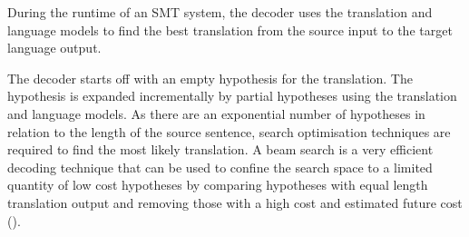 




During the runtime of an \acrshort{SMT} system, the decoder uses the translation and language models to find the best translation from the source input to the target language output.

The decoder starts off with an empty hypothesis for the translation. The hypothesis is expanded incrementally by partial hypotheses using the translation and language models. As there are an exponential number of hypotheses in relation to the length of the source sentence, search optimisation techniques are required to find the most likely translation. A beam search is a very efficient decoding technique that can be used to confine the search space to a limited quantity of low cost hypotheses by comparing hypotheses with equal length translation output and removing those with a high cost and estimated future cost (\cite{koehn_pharaoh_2004}).







